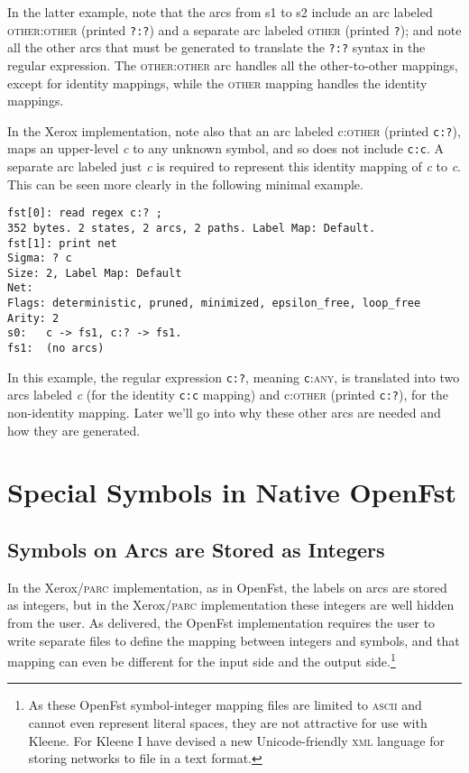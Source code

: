 \documentclass[letterpaper,11pt]{article}
\providecommand{\acro}{}\renewcommand{\acro}{\textsc}
\begin{document}
\noindent
In the latter example, note that the arcs from s1 to s2 include an
arc labeled \acro{other}:\acro{other} (printed \texttt{?:?}) 
and a separate arc labeled \acro{other} (printed \texttt{?}); and note all the other arcs that must be generated to translate
the \texttt{?:?} syntax in the regular expression.   The
\acro{other}:\acro{other} arc handles all the other-to-other mappings, except for
identity mappings, while the \acro{other} mapping handles the identity
mappings.  

In the Xerox implementation, note also that an arc labeled
c:\acro{other} (printed \texttt{c:?}), maps an upper-level \emph{c} to
any unknown symbol, and so does not include \texttt{c:c}.  A separate arc labeled just \emph{c} is
required to represent this identity mapping of \emph{c} to \emph{c}.
This can be seen more clearly in the following minimal example.

\begin{Verbatim}[fontsize=\footnotesize]
fst[0]: read regex c:? ;
352 bytes. 2 states, 2 arcs, 2 paths. Label Map: Default.
fst[1]: print net
Sigma: ? c
Size: 2, Label Map: Default
Net: 
Flags: deterministic, pruned, minimized, epsilon_free, loop_free
Arity: 2
s0:   c -> fs1, c:? -> fs1.
fs1:  (no arcs)
\end{Verbatim}

\noindent
In this example, the regular expression \texttt{c:?}, meaning
\texttt{c}:\acro{any}, is translated into two arcs labeled \emph{c} (for the
identity \texttt{c:c} mapping) and c:\acro{other} (printed \texttt{c:?}), 
for the non-identity mapping.
Later we'll go into why these other arcs are needed and
how they are generated.


\section{Special Symbols in Native OpenFst}

\subsection{Symbols on Arcs are Stored as Integers}

In the Xerox/\acro{parc} implementation, as in OpenFst, the labels on arcs are stored as
integers, but in the Xerox/\acro{parc} implementation these integers are well hidden from
the user.  As delivered, the OpenFst implementation requires the user
to write separate files to define the mapping between integers and
symbols, and that mapping can even be different for the input side
and the output side.\footnote{As these OpenFst symbol-integer
mapping files are limited to \acro{ascii} and cannot even represent
literal spaces, they are not attractive for use with Kleene.  For
Kleene I have devised a new Unicode-friendly \acro{xml} language for
storing networks to file in a text format.}
\end{document}
